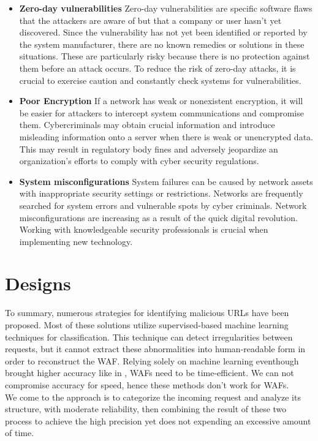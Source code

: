 \begin{itemize}
    \item \textbf{Zero-day vulnerabilities}
    Zero-day vulnerabilities are specific software flaws that the attackers are aware of but that a company or user hasn't yet discovered.
    Since the vulnerability has not yet been identified or reported by the system manufacturer, there are no known remedies or solutions in these situations. These are particularly risky because there is no protection against them before an attack occurs. To reduce the risk of zero-day attacks, it is crucial to exercise caution and constantly check systems for vulnerabilities.
    \item \textbf{Poor Encryption}
    If a network has weak or nonexistent encryption, it will be easier for attackers to intercept system communications and compromise them. Cybercriminals may obtain crucial information and introduce misleading information onto a server when there is weak or unencrypted data. This may result in regulatory body fines and adversely jeopardize an organization's efforts to comply with cyber security regulations.
    \item \textbf{System misconfigurations}
    System failures can be caused by network assets with inappropriate security settings or restrictions. Networks are frequently searched for system errors and vulnerable spots by cyber criminals. Network misconfigurations are increasing as a result of the quick digital revolution. Working with knowledgeable security professionals is crucial when implementing new technology.

\end{itemize}
\section{Designs}
\label{design}
To summary, numerous strategies for identifying malicious URLs have been proposed. Most of these solutions utilize supervised-based machine learning techniques for classification. This technique can detect irregularities between requests, but it cannot extract these abnormalities into human-readable form in order to reconstruct the WAF. Relying solely on machine learning eventhough brought higher accuracy like in \cite{s22093373}, WAFs need to be time-efficient. We can not compromise accuracy for speed, hence these methods don't work for WAFs.\\
We come to the approach is to categorize the incoming request and analyze its structure, with moderate reliability, then combining the result of these two process to achieve the high precision yet does not expending an excessive amount of time.

